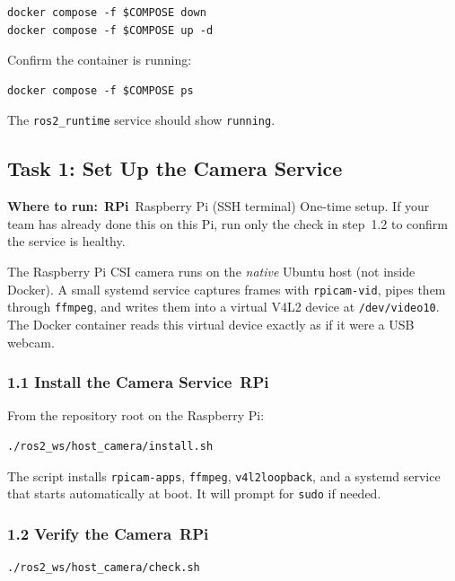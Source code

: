 \documentclass{ol-softwaremanual}
\newcommand{\onrpi}{%
  \,\colorbox{blue!20}{\footnotesize\sffamily\bfseries RPi}}
\newcommand{\machinebox}[2]{%
  \par\noindent
  \colorbox{gray!12}{\parbox{\dimexpr\linewidth-2\fboxsep}{%
    \small\sffamily\textbf{Where to run:} #1 \quad\textbar\quad #2}}%
  \par\smallskip}
\begin{document}
\begin{verbatim}
docker compose -f $COMPOSE down
docker compose -f $COMPOSE up -d
\end{verbatim}

Confirm the container is running:

\begin{verbatim}
docker compose -f $COMPOSE ps
\end{verbatim}

The \texttt{ros2\_runtime} service should show \texttt{running}.


\subsection{Task 1: Set Up the Camera Service}

\machinebox{\onrpi\ Raspberry Pi (SSH terminal)}{One-time setup. If your team has already done this on this Pi, run only the check in step~1.2 to confirm the service is healthy.}

The Raspberry Pi CSI camera runs on the \emph{native} Ubuntu host (not inside
Docker).
A small systemd service captures frames with \texttt{rpicam-vid}, pipes them
through \texttt{ffmpeg}, and writes them into a virtual V4L2 device at
\texttt{/dev/video10}.
The Docker container reads this virtual device exactly as if it were a USB
webcam.

\subsubsection*{1.1 Install the Camera Service\onrpi}

From the repository root on the Raspberry Pi:

\begin{verbatim}
./ros2_ws/host_camera/install.sh
\end{verbatim}

The script installs \texttt{rpicam-apps}, \texttt{ffmpeg},
\texttt{v4l2loopback}, and a systemd service that starts automatically at boot.
It will prompt for \texttt{sudo} if needed.

\subsubsection*{1.2 Verify the Camera\onrpi}

\begin{verbatim}
./ros2_ws/host_camera/check.sh
\end{verbatim}
\end{document}

